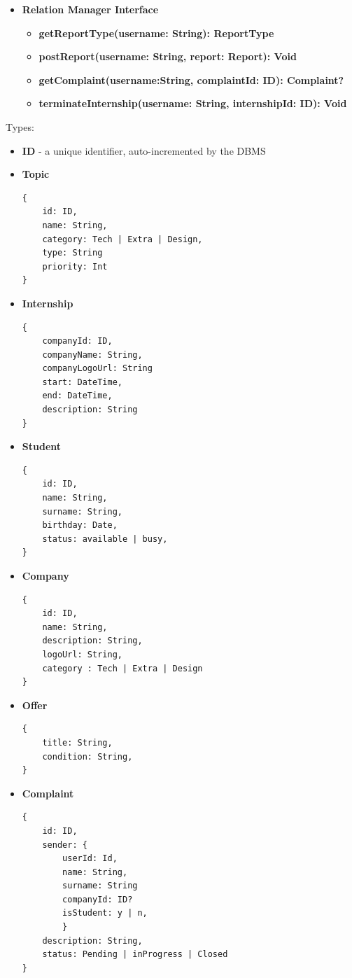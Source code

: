 \begin{itemize}
    \item \textbf{Relation Manager Interface}
    \begin{itemize}
        \item 
        \textbf{getReportType(username: String): ReportType}
        \item 
        \textbf{postReport(username: String, report: Report): Void}
        \item \textbf{getComplaint(username:String, complaintId: ID): Complaint?}
        \item \textbf{terminateInternship(username: String, internshipId: ID): Void}
    \end{itemize}
    
\end{itemize}

Types:
\begin{itemize}
    \item \textbf{ID} {-} a unique identifier, auto-incremented by the DBMS

    \item \textbf{Topic}
    \begin{lstlisting}
{
    id: ID,
    name: String,
    category: Tech | Extra | Design,
    type: String
    priority: Int
} 
          \end{lstlisting}
    \item \textbf{Internship}
          \begin{lstlisting}
{
    companyId: ID,
    companyName: String,
    companyLogoUrl: String
    start: DateTime,
    end: DateTime,
    description: String
} 
          \end{lstlisting}
    \item \textbf{Student}
          \begin{lstlisting}
{
    id: ID,
    name: String, 
    surname: String,
    birthday: Date,
    status: available | busy,
} 
          \end{lstlisting}
    \item \textbf{Company}
          \begin{lstlisting}
{
    id: ID,
    name: String,
    description: String,
    logoUrl: String, 
    category : Tech | Extra | Design 
}
          \end{lstlisting}
        
    \item \textbf{Offer}
          \begin{lstlisting}
{
    title: String,
    condition: String,
} 
          \end{lstlisting}
    \item \textbf{Complaint}
          \begin{lstlisting}
{
    id: ID,
    sender: {
        userId: Id,
        name: String,
        surname: String
        companyId: ID?
        isStudent: y | n,
        }
    description: String,
    status: Pending | inProgress | Closed
} 
          \end{lstlisting}


\end{itemize}
